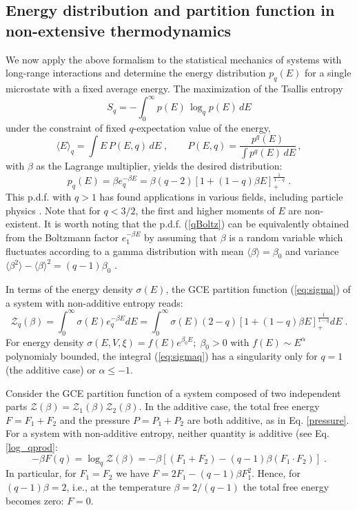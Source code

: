 \documentclass[a4paper,12pt]{amsart}
\theoremstyle{definition}
\theoremstyle{remark}
\begin{document}
\subsection{Energy distribution and partition function in non-extensive thermodynamics}
We now apply the above formalism to the statistical mechanics of systems with long-range interactions and determine the energy distribution $p_q(E)$ for a single microstate with a fixed average energy. The maximization of the Tsallis entropy
\[
S_q = -\int_{0}^{\infty} p(E)\,\log_q p(E)\, dE
\]
under the constraint of fixed \(q\)-expectation value of the energy,
\[
\langle E \rangle_q = \int E\, P(E,q)\, dE\;,\qquad P(E,q) = \frac{p^q(E)}{\int p^q(E)\, dE}\,,
\]
with $\beta$ as the Lagrange multiplier, yields the desired distribution:
\begin{equation}\label{qBoltz}
p_q(E)=\beta e_q^{-\beta E}
=\beta(q-2)\left[1+(1-q)\beta E\right]_{+}^{\frac{1}{1-q}}\;.
\end{equation}
This p.d.f. with $q>1$ has found applications in various fields, including particle physics \cite{Cleymans:2011in}. Note that for $q<3/2$, the first and higher moments of $E$ are non-existent. It is worth noting that the p.d.f. (\ref{qBoltz}) can be equivalently obtained from the Boltzmann factor $e_1^{-\beta E}$  by assuming that $\beta$ is a random variable which fluctuates according to a gamma distribution with mean $\langle \beta \rangle = \beta_0$ and variance $\langle \beta^2 \rangle - \langle \beta \rangle^2 = (q-1)\beta_0$ \cite{Wilk:1999dr}.

In terms of the energy density $\sigma(E)$, the GCE partition function (\ref{eq:sigma}) of a system with non-additive entropy reads: 
\begin{equation}\label{eq:sigmaq}
\mathcal{Z}_q(\beta)= \int_0^{\infty}\sigma(E) e_q^{-\beta E} dE = \int_0^{\infty}\sigma(E)  (2-q)\left[1+(1-q)\beta E\right]_{+}^{\frac{1}{1-q}} dE\;.
\end{equation}
For energy density
$\sigma(E, V, \xi)=f(E) e^{\beta_0 E};\; \beta_0>0$
with $f(E)\sim E^{\alpha}$ polynomialy bounded, the integral (\ref{eq:sigmaq}) has a singularity only for $q=1$ (the additive case) or $\alpha \leq -1$.

Consider the GCE partition function of a system composed of two independent parts $\mathcal{Z}(\beta) = \mathcal{Z}_1(\beta)\mathcal{Z}_2(\beta)$. 
In the additive case, the total free energy $F=F_1+F_2$ and the pressure $P=P_1+P_2$ are both additive, as in Eq. \ref{pressure}.
For a system with non-additive entropy, neither quantity  is additive (see Eq.\ref{log_qprod}:
\begin{equation}\label{eq:sigmaq1}
-\beta F(q) = \log_q\mathcal{Z}(\beta)= 
-\beta \left[(F_1+F_2) -(q-1)\beta (F_1\cdot F_2) \right]\;.
\end{equation}
In particular, for $F_1=F_2$ we have $F=2F_1-(q-1)\beta F_1^2$. Hence, for $(q-1)\beta=2$, i.e., at the temperature $\beta=2/(q-1)$ the total free energy becomes zero: $F=0$. 
\end{document}
